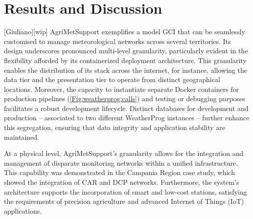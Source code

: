 \documentclass[authoryear,preprint,review,12pt]{elsarticle}
\begin{document}



\section{Results and Discussion}[Giuliano][wip]
AgriMetSupport exemplifies a model GCI that can be seamlessly customised to manage meteorological networks across several territories.
Its design underscores pronounced multi-level granularity,
particularly evident in the flexibility afforded by its containerized deployment architecture. 
This granularity enables the distribution of its stack across the internet, for instance, allowing the data tier and the presentation tier to operate from distinct geographical locations. 
Moreover, the capacity to instantiate separate Docker containers for production pipelines (\cref{Fig:weatherprog:calls}) and testing or debugging purposes facilitates a robust development lifecycle.
Distinct databases for development and production -- associated to two different WeatherProg instances -- further enhance this segregation, ensuring that data integrity and application stability are maintained.

At a physical level, AgriMetSupport's granularity allows for the integration and management of disparate monitoring networks within a unified infrastructure.
This capability was demonstrated in the Campania Region case study, which showed the integration of CAR and DCP networks.
Furthermore, the system's architecture supports the incorporation of smart and low-cost stations, satisfying the requirements of precision agriculture and advanced Internet of Things (IoT) applications. %
\end{document}
